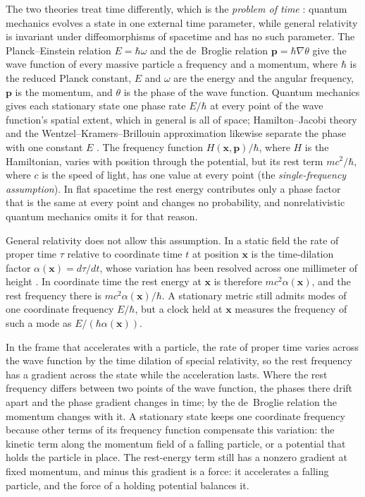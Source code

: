 \documentclass[aps,prd,onecolumn,tightenlines,nofootinbib,notitlepage,11pt,floatfix]{revtex4-2}
\theoremstyle{indentedtheorem}
\begin{document}
The two theories treat time differently, which is the \emph{problem of time} \citep{Isham1993Canonical,Kuchavr1992Time,Anderson2012Problem}: quantum mechanics evolves a state in one external time parameter, while general relativity is invariant under diffeomorphisms of spacetime and has no such parameter. The Planck--Einstein relation $E=\hbar\omega$ \citep{Planck1901Radiation,Einstein1905Photoelectric} and the de~Broglie relation $\mathbf{p}=\hbar\nabla\theta$ \citep{deBroglie1925Thesis} give the wave function of every massive particle a frequency and a momentum, where $\hbar$ is the reduced Planck constant, $E$ and $\omega$ are the energy and the angular frequency, $\mathbf{p}$ is the momentum, and $\theta$ is the phase of the wave function. Quantum mechanics gives each stationary state one phase rate $E/\hbar$ at every point of the wave function's spatial extent, which in general is all of space; Hamilton--Jacobi theory and the Wentzel--Kramers--Brillouin approximation likewise separate the phase with one constant $E$ \citep{Wentzel1926WKB,Kramers1926WKB,Brillouin1926WKB,Goldstein2002Classical}. The frequency function $H(\mathbf{x},\mathbf{p})/\hbar$, where $H$ is the Hamiltonian, varies with position through the potential, but its rest term $mc^2/\hbar$, where $c$ is the speed of light, has one value at every point (the \emph{single-frequency assumption}). In flat spacetime the rest energy contributes only a phase factor that is the same at every point and changes no probability, and nonrelativistic quantum mechanics omits it for that reason.

General relativity does not allow this assumption. In a static field the rate of proper time $\tau$ relative to coordinate time $t$ at position $\mathbf{x}$ is the time-dilation factor $\alpha(\mathbf{x})=d\tau/dt$, whose variation has been resolved across one millimeter of height \citep{Bothwell2022Resolving}. In coordinate time the rest energy at $\mathbf{x}$ is therefore $mc^2\alpha(\mathbf{x})$, and the rest frequency there is $mc^2\alpha(\mathbf{x})/\hbar$. A stationary metric still admits modes of one coordinate frequency $E/\hbar$, but a clock held at $\mathbf{x}$ measures the frequency of such a mode as $E/(\hbar\alpha(\mathbf{x}))$.

In the frame that accelerates with a particle, the rate of proper time varies across the wave function by the time dilation of special relativity, so the rest frequency has a gradient across the state while the acceleration lasts. Where the rest frequency differs between two points of the wave function, the phases there drift apart and the phase gradient changes in time; by the de~Broglie relation the momentum changes with it. A stationary state keeps one coordinate frequency because other terms of its frequency function compensate this variation: the kinetic term along the momentum field of a falling particle, or a potential that holds the particle in place. The rest-energy term still has a nonzero gradient at fixed momentum, and minus this gradient is a force: it accelerates a falling particle, and the force of a holding potential balances it.
\end{document}
